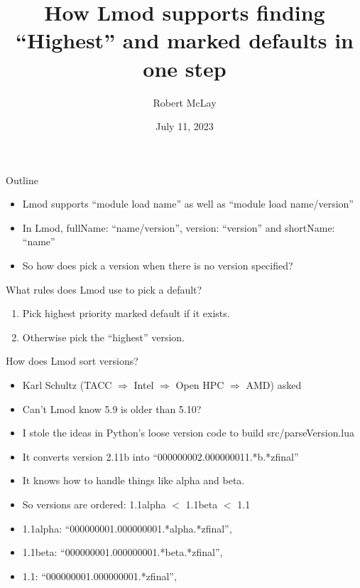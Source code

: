 \documentclass{beamer}
\begin{document}
\title[Lmod]{How Lmod supports finding ``Highest'' and marked defaults
in one step}
\author{Robert McLay} 
\date{July 11, 2023}

\frame{\titlepage} 


\begin{frame}{Outline}
  \begin{itemize}
    \item Lmod supports ``module load name'' as well as ``module load
      name/version''
    \item In Lmod, fullName: ``name/version'', version: ``version''
      and shortName: ``name''
    \item So how does pick a version when there is no version specified?
  \end{itemize}
\end{frame}

\begin{frame}{What rules does Lmod use to pick a default?}
  \begin{enumerate}
    \item Pick highest priority marked default if it exists.
    \item Otherwise pick the ``highest'' version.
  \end{enumerate}
\end{frame}

\begin{frame}{How does Lmod sort versions?}
  \begin{itemize}
    \item Karl Schultz (TACC $\Rightarrow$ Intel $\Rightarrow$ Open
      HPC $\Rightarrow$ AMD) asked
    \item Can't Lmod know 5.9 is older than 5.10?
    \item I stole the ideas in Python's loose version code to build src/parseVersion.lua
    \item It converts version 2.11b into
      ``000000002.000000011.*b.*zfinal''
    \item It knows how to handle things like alpha and beta.
    \item So versions are ordered:  1.1alpha $<$ 1.1beta $<$ 1.1
    \item 1.1alpha: ``000000001.000000001.*alpha.*zfinal'',
    \item 1.1beta: ``000000001.000000001.*beta.*zfinal'',
    \item 1.1: ``000000001.000000001.*zfinal'',
  \end{itemize}
\end{frame}
\end{document}
